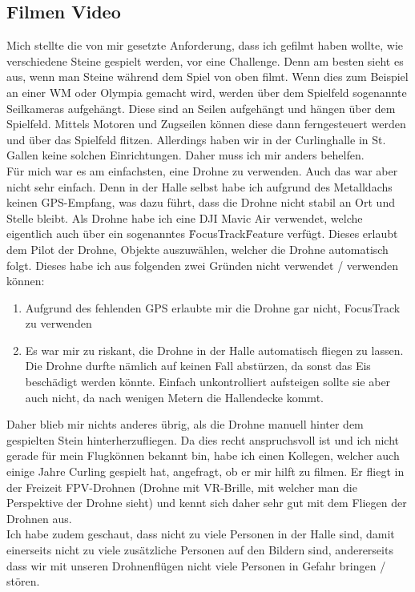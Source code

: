 \documentclass[11pt]{article}
\begin{document}
    \subsection{Filmen Video}
    Mich stellte die von mir gesetzte Anforderung, dass ich gefilmt haben wollte, wie verschiedene Steine gespielt werden, vor eine Challenge.
    Denn am besten sieht es aus, wenn man Steine während dem Spiel von oben filmt. Wenn dies zum Beispiel an einer WM oder Olympia gemacht wird,
    werden über dem Spielfeld sogenannte Seilkameras aufgehängt. Diese sind an Seilen aufgehängt und hängen über dem Spielfeld. Mittels Motoren
    und Zugseilen können diese dann ferngesteuert werden und über das Spielfeld flitzen. Allerdings haben wir in der Curlinghalle in St. Gallen
    keine solchen Einrichtungen. Daher muss ich mir anders behelfen.\\
    Für mich war es am einfachsten, eine Drohne zu verwenden. Auch das war aber nicht sehr einfach. Denn in der Halle selbst habe ich aufgrund
    des Metalldachs keinen GPS-Empfang, was dazu führt, dass die Drohne nicht stabil an Ort und Stelle bleibt.
    Als Drohne habe ich eine DJI Mavic Air verwendet, welche eigentlich auch über ein sogenanntes \"FocusTrack\" Feature verfügt. Dieses erlaubt dem
    Pilot der Drohne, Objekte auszuwählen, welcher die Drohne automatisch folgt. Dieses habe ich aus folgenden zwei Gründen nicht verwendet
    / verwenden können:

    \begin{enumerate}
        \item Aufgrund des fehlenden GPS erlaubte mir die Drohne gar nicht, FocusTrack zu verwenden
        \item Es war mir zu riskant, die Drohne in der Halle automatisch fliegen zu lassen. Die Drohne durfte nämlich auf keinen Fall abstürzen,
        da sonst das Eis beschädigt werden könnte. Einfach unkontrolliert aufsteigen sollte sie aber auch nicht, da nach wenigen Metern
        die Hallendecke kommt.
    \end{enumerate}

    Daher blieb mir nichts anderes übrig, als die Drohne manuell hinter dem gespielten Stein hinterherzufliegen. Da dies recht anspruchsvoll ist
    und ich nicht gerade für mein Flugkönnen bekannt bin, habe ich einen Kollegen, welcher auch einige Jahre Curling gespielt hat, angefragt, ob er
    mir hilft zu filmen. Er fliegt in der Freizeit FPV-Drohnen (Drohne mit VR-Brille, mit welcher man die Perspektive der Drohne sieht) und kennt
    sich daher sehr gut mit dem Fliegen der Drohnen aus.\\
    Ich habe zudem geschaut, dass nicht zu viele Personen in der Halle sind, damit einerseits nicht zu viele zusätzliche Personen auf den Bildern
    sind, andererseits dass wir mit unseren Drohnenflügen nicht viele Personen in Gefahr bringen / stören.\\
\end{document}
